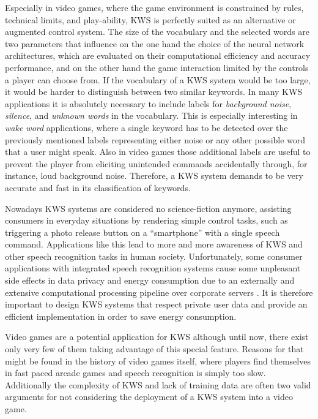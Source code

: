 Especially in video games, where the game environment is constrained by rules, technical limits, and play-ability, KWS is perfectly suited as an alternative or augmented control system.
The size of the vocabulary and the selected words are two parameters that influence on the one hand the choice of the neural network architectures, which are evaluated on their computational efficiency and accuracy performance, and on the other hand the game interaction limited by the controls a player can choose from.
If the vocabulary of a KWS system would be too large, it would be harder to distinguish between two similar keywords.
In many KWS applications it is absolutely necessary to include labels for \emph{background noise}, \emph{silence}, and \emph{unknown words} in the vocabulary. 
This is especially interesting in \emph{wake word} applications, where a single keyword has to be detected over the previously mentioned labels representing either noise or any other possible word that a user might speak.
Also in video games those additional labels are useful to prevent the player from eliciting unintended commands accidentally through, for instance, loud background noise.
Therefore, a KWS system demands to be very accurate and fast in its classification of keywords.

Nowadays KWS systems are considered no science-fiction anymore, assisting consumers in everyday situations by rendering simple control tasks, such as triggering a photo release button on a \enquote{smartphone} with a single speech command.
Applications like this lead to more and more awareness of KWS and other speech recognition tasks in human society.
Unfortunately, some consumer applications with integrated speech recognition systems cause some unpleasant side effects in data privacy and energy consumption due to an externally and extensive computational processing pipeline over corporate servers \cite{Tang2018}.
It is therefore important to design KWS systems that respect private user data and provide an efficient implementation in order to save energy consumption.

Video games are a potential application for KWS although until now, there exist only very few of them taking advantage of this special feature.
Reasons for that might be found in the history of video games itself, where players find themselves in fast paced arcade games and speech recognition is simply too slow.
Additionally the complexity of KWS and lack of training data are often two valid arguments for not considering the deployment of a KWS system into a video game.

